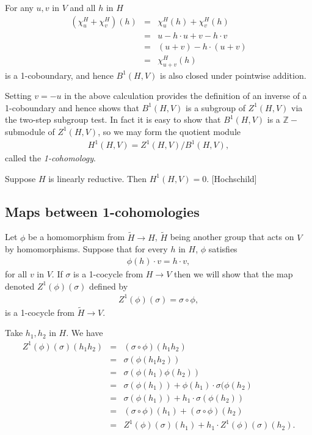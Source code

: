For any $u,v$ in $V$ and all $h$ in $H$
\begin{eqnarray*}
	(\chi^H_u + \chi^H_v)(h) &=& \chi^H_u(h) + \chi^H_v(h)\\
	&=& u - h\cdot u + v - h\cdot v \\
	&=& (u + v) - h\cdot (u + v) \\
	&=& \chi^H_{u + v} (h)
\end{eqnarray*}
is a 1-coboundary, and hence $B^1\left(H, V\right)$ is also closed under pointwise addition.

Setting $v = -u$ in the above calculation provides the definition of an inverse of a 1-coboundary and hence shows that $B^1(H, V)$ is a subgroup of $Z^1(H, V)$ via the two-step subgroup test. In fact it is easy to show that $B^1(H, V)$ is a $\mathbb{Z}-$submodule of $Z^1(H, V)$, so we may form the quotient module
\begin{eqnarray*}
	H^1\left(H, V\right) = Z^1\left(H, V\right) / B^1\left(H, V\right),
\end{eqnarray*}
called the \emph{1-cohomology}.
\begin{lemma} Suppose $H$ is linearly reductive. Then $H^1(H, V) = 0$. [Hochschild]
\end{lemma}

\subsection{Maps between 1-cohomologies}
Let $\phi$ be a homomorphism from $\tilde{H}\rightarrow H$, $\tilde{H}$ being another group that acts on $V$ by homomorphisms. Suppose that for every $h$ in $H$, $\phi$ satisfies
\begin{eqnarray*}
	\phi(h)\cdot v = h\cdot v,
\end{eqnarray*}
for all $v$ in $V$. If $\sigma$ is a 1-cocycle from $H\rightarrow V$ then we will show that the map denoted $Z^1(\phi)(\sigma)$ defined by
\begin{eqnarray*}
	Z^1(\phi)(\sigma) = \sigma \circ \phi,
\end{eqnarray*}
is a 1-cocycle from $\tilde{H}\rightarrow V$.

Take $h_1, h_2$ in $H$. We have
\begin{eqnarray*}
	Z^1(\phi)(\sigma)(h_1h_2) &=& (\sigma \circ \phi)(h_1h_2) \\
		&=& \sigma(\phi(h_1h_2)) \\
		&=& \sigma(\phi(h_1)\phi(h_2)) \\
		&=& \sigma(\phi(h_1)) + \phi(h_1)\cdot\sigma(\phi(h_2) \\
		&=& \sigma(\phi(h_1)) + h_1\cdot\sigma(\phi(h_2)) \\
		&=& (\sigma \circ \phi)(h_1) + (\sigma \circ \phi)(h_2) \\
		&=& Z^1(\phi)(\sigma)(h_1) + h_1\cdot Z^1(\phi)(\sigma)(h_2).
\end{eqnarray*}

